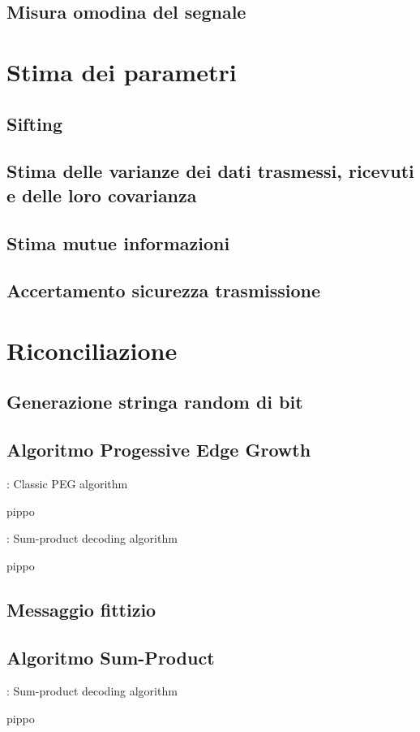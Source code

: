 \subsection{Misura omodina del segnale}

\section{Stima dei parametri}

\subsection{Sifting}
\subsection{Stima delle varianze dei dati trasmessi, ricevuti e delle loro covarianza}
\subsection{Stima mutue informazioni}
\subsection{Accertamento sicurezza trasmissione}

\section{Riconciliazione}

\subsection{Generazione stringa random di bit}

\subsection{Algoritmo Progessive Edge Growth}


\begin{algorithm}
\caption{: Classic PEG algorithm}
\begin{algorithmic}
\STATE pippo 
\end{algorithmic}
\end{algorithm}


\begin{algorithm}
\caption{: Sum-product decoding algorithm}
\begin{algorithmic}
\STATE pippo
\end{algorithmic}
\end{algorithm}

\subsection{Messaggio fittizio}

\subsection{Algoritmo Sum-Product}

\begin{algorithm}
\caption{: Sum-product decoding algorithm}
\begin{algorithmic}
\STATE pippo
\end{algorithmic}
\end{algorithm}




